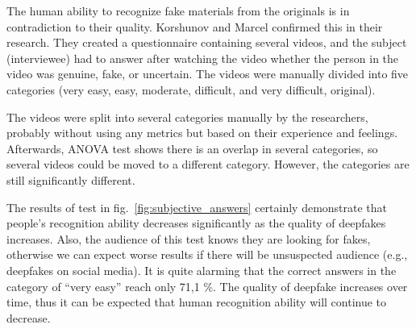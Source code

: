 The human ability to recognize fake materials from the originals is in contradiction to their quality. Korshunov and Marcel \cite{TheThreatOfDeepfakes} confirmed this in their research. They created a questionnaire containing several videos, and the subject (interviewee) had to answer after watching the video whether the person in the video was genuine, fake, or uncertain. The videos were manually divided into five categories (very easy, easy, moderate, difficult, and very difficult, original). 

The videos were split into several categories manually by the researchers, probably without using any metrics but based on their experience and feelings. Afterwards, ANOVA test shows there is an overlap in several categories, so several videos could be moved to a different category. However, the categories are still significantly different.

The results of test in fig.~\ref{fig:subjective_answers} certainly demonstrate that people's recognition ability decreases significantly as the quality of deepfakes increases. Also, the audience of this test knows they are looking for fakes, otherwise we can expect worse results if there will be unsuspected audience (e.g., deepfakes on social media). It is quite alarming that the correct answers in the category of “very easy” reach only 71,1 \%. The quality of deepfake increases over time, thus it can be expected that human recognition ability will continue to decrease. \cite{TheThreatOfDeepfakes}

